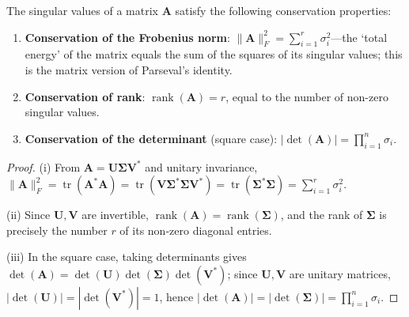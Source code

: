\begin{proposition}\label{prop:svd_conservation}
The singular values of a matrix $\mathbf{A}$ satisfy the following conservation properties:
\begin{enumerate}[label=(\roman*)]
    \item \textbf{Conservation of the Frobenius norm}: $\|\mathbf{A}\|_F^2 = \sum_{i=1}^r \sigma_i^2$---the `total energy' of the matrix equals the sum of the squares of its singular values; this is the matrix version of Parseval's identity.
    \item \textbf{Conservation of rank}: $\operatorname{rank}(\mathbf{A}) = r$, equal to the number of non-zero singular values.
    \item \textbf{Conservation of the determinant} (square case): $|\det(\mathbf{A})| = \prod_{i=1}^n \sigma_i$.
\end{enumerate}
\end{proposition}

\begin{proof}
(i) From $\mathbf{A} = \mathbf{U}\boldsymbol{\Sigma}\mathbf{V}^*$ and unitary invariance, $\|\mathbf{A}\|_F^2 = \operatorname{tr}(\mathbf{A}^*\mathbf{A}) = \operatorname{tr}(\mathbf{V}\boldsymbol{\Sigma}^*\boldsymbol{\Sigma}\mathbf{V}^*) = \operatorname{tr}(\boldsymbol{\Sigma}^*\boldsymbol{\Sigma}) = \sum_{i=1}^r \sigma_i^2$.

(ii) Since $\mathbf{U}, \mathbf{V}$ are invertible, $\operatorname{rank}(\mathbf{A}) = \operatorname{rank}(\boldsymbol{\Sigma})$, and the rank of $\boldsymbol{\Sigma}$ is precisely the number $r$ of its non-zero diagonal entries.

(iii) In the square case, taking determinants gives $\det(\mathbf{A}) = \det(\mathbf{U})\det(\boldsymbol{\Sigma})\det(\mathbf{V}^*)$; since $\mathbf{U}, \mathbf{V}$ are unitary matrices, $|\det(\mathbf{U})| = |\det(\mathbf{V}^*)| = 1$, hence $|\det(\mathbf{A})| = |\det(\boldsymbol{\Sigma})| = \prod_{i=1}^n \sigma_i$.
\end{proof}

